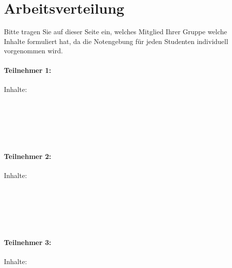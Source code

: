 \chapter*{Arbeitsverteilung}

Bitte tragen Sie auf dieser Seite ein, welches Mitglied Ihrer Gruppe welche Inhalte formuliert hat, da die Notengebung für jeden Studenten individuell vorgenommen wird.\\
\\
\textbf{Teilnehmer 1:} \\
\\
 Inhalte: \\
\\
\\
\\
\\
\\
\\
\textbf{Teilnehmer 2:} \\
\\
 Inhalte: \\
\\
\\
\\
\\
\\
\\
\textbf{Teilnehmer 3:} \\
\\
 Inhalte: 